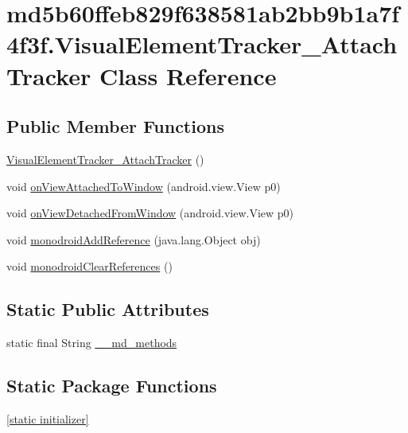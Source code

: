\hypertarget{classmd5b60ffeb829f638581ab2bb9b1a7f4f3f_1_1_visual_element_tracker___attach_tracker}{
\section{md5b60ffeb829f638581ab2bb9b1a7f4f3f.VisualElementTracker\_\-AttachTracker Class Reference}
\label{classmd5b60ffeb829f638581ab2bb9b1a7f4f3f_1_1_visual_element_tracker___attach_tracker}
}
\subsection*{Public Member Functions}
\begin{CompactItemize}
\item 
\hyperlink{classmd5b60ffeb829f638581ab2bb9b1a7f4f3f_1_1_visual_element_tracker___attach_tracker_4e41b67296eb503919324db1e277448e}{VisualElementTracker\_\-AttachTracker} ()
\item 
void \hyperlink{classmd5b60ffeb829f638581ab2bb9b1a7f4f3f_1_1_visual_element_tracker___attach_tracker_d14cce97063ca82046c9d85fe80f1557}{onViewAttachedToWindow} (android.view.View p0)
\item 
void \hyperlink{classmd5b60ffeb829f638581ab2bb9b1a7f4f3f_1_1_visual_element_tracker___attach_tracker_ba4af8dd2c0947aedc8cdf3444295589}{onViewDetachedFromWindow} (android.view.View p0)
\item 
void \hyperlink{classmd5b60ffeb829f638581ab2bb9b1a7f4f3f_1_1_visual_element_tracker___attach_tracker_fdae8ddc75402aa21d5d750978d45de0}{monodroidAddReference} (java.lang.Object obj)
\item 
void \hyperlink{classmd5b60ffeb829f638581ab2bb9b1a7f4f3f_1_1_visual_element_tracker___attach_tracker_a7c289b9198727a036075508791a2563}{monodroidClearReferences} ()
\end{CompactItemize}
\subsection*{Static Public Attributes}
\begin{CompactItemize}
\item 
static final String \hyperlink{classmd5b60ffeb829f638581ab2bb9b1a7f4f3f_1_1_visual_element_tracker___attach_tracker_16358e9d6e1593b6ee783eac6cc7ee81}{\_\-\_\-md\_\-methods}
\end{CompactItemize}
\subsection*{Static Package Functions}
\begin{CompactItemize}
\item 
\hyperlink{classmd5b60ffeb829f638581ab2bb9b1a7f4f3f_1_1_visual_element_tracker___attach_tracker_6ecdcd4450d43432d52c224a66692715}{\mbox{[}static initializer\mbox{]}}
\end{CompactItemize}
